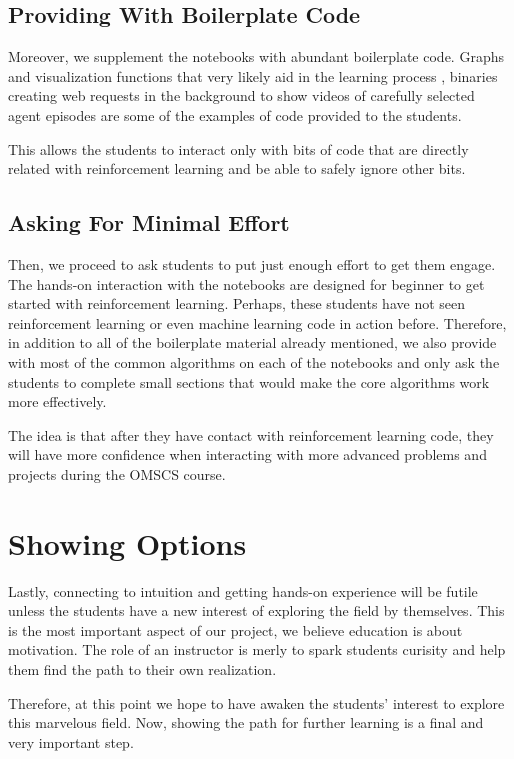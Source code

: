 \documentclass[11pt]{article} %
\begin{document}
\subsection{Providing With Boilerplate Code}

Moreover, we supplement the notebooks with abundant boilerplate code. Graphs and
visualization functions that very likely aid in the learning process \cite{visualization},
binaries creating web requests in the background to show videos of carefully
selected agent episodes are some of the examples of
code provided to the students.

This allows the students to interact only with bits of code that are directly
related with reinforcement learning and be able to safely ignore other bits.

\subsection{Asking For Minimal Effort}

Then, we proceed to ask students to put just enough effort to get them engage.
The hands-on interaction with the notebooks are designed for beginner to get
started with reinforcement learning. Perhaps, these students have not seen
reinforcement learning or even machine learning code in action before. Therefore,
in addition to all of the boilerplate material already mentioned, we also
provide with most of the common algorithms on each of the notebooks and
only ask the students to complete small sections that would make the core
algorithms work more effectively.

The idea is that after they have contact with reinforcement learning code, they
will have more confidence when interacting with more advanced problems and
projects during the OMSCS course.

\section{Showing Options}

Lastly, connecting to intuition and getting hands-on experience will be
futile unless the students have a new interest of exploring the field by
themselves. This is the most important aspect of our project, we believe
education is about motivation. The role of an instructor is merly to spark
students curisity and help them find the path to their own realization.

Therefore, at this point we hope to have awaken the students' interest to
explore this marvelous field. Now, showing the path for further learning is
a final and very important step.
\end{document}
